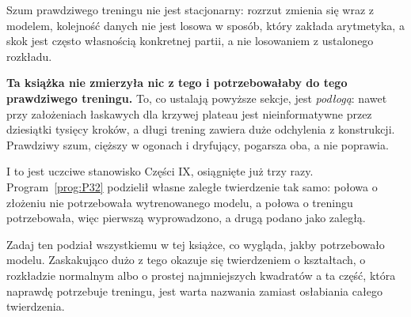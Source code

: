 \begin{fr}
Szum prawdziwego treningu nie jest stacjonarny: rozrzut zmienia się wraz z
modelem, kolejność danych nie jest losowa w sposób, który zakłada arytmetyka,
a skok jest często własnością konkretnej partii, a nie losowaniem z ustalonego
rozkładu.

\begin{warning}
\textbf{Ta książka nie zmierzyła nic z tego i potrzebowałaby do tego
prawdziwego treningu.} To, co ustalają powyższe sekcje, jest \emph{podłogą}:
nawet przy założeniach łaskawych dla krzywej plateau jest nieinformatywne
przez dziesiątki tysięcy kroków, a długi trening zawiera duże odchylenia z
konstrukcji. Prawdziwy szum, cięższy w ogonach i dryfujący, pogarsza oba, a
nie poprawia.
\end{warning}
\end{fr}

\begin{fr}
I to jest uczciwe stanowisko Części IX, osiągnięte już trzy razy.
Program~\ref{prog:P32} podzielił własne zaległe twierdzenie tak samo: połowa o
złożeniu nie potrzebowała wytrenowanego modelu, a połowa o treningu
potrzebowała, więc pierwszą wyprowadzono, a drugą podano jako zaległą.

Zadaj ten podział wszystkiemu w tej książce, co wygląda, jakby potrzebowało
modelu. Zaskakująco dużo z tego okazuje się twierdzeniem o kształtach, o
rozkładzie normalnym albo o prostej najmniejszych kwadratów \dash{} a ta
część, która naprawdę potrzebuje treningu, jest warta nazwania zamiast
osłabiania całego twierdzenia.
\end{fr}

